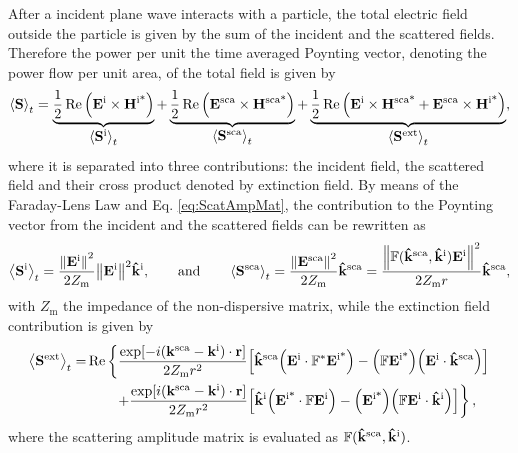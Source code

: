 After a incident plane wave interacts with a particle, the total electric field outside the particle is given by the sum of the incident and the scattered fields. Therefore the power per unit  the time averaged Poynting vector, denoting the power flow per unit area, of the total field is given by 
%
\begin{align}
\ev{\vb{S}}_t 
		= \underbrace{\frac12 \Re \qty(\vb{E}^\text{i}\times\vb{H}^\text{i*})}_{\text{\normalsize $\ev{\vb{S}^\text{i}}_t $}} + 
		\underbrace{\frac12 \Re \qty(\vb{E}^\text{sca}\times\vb{H}^\text{sca*})}_{\text{\normalsize $\ev{\vb{S}^\text{sca}}_t $}}+
		\underbrace{	\frac12 \Re\qty(\vb{E}^\text{i}\times\vb{H}^\text{sca*} + \vb{E}^\text{sca}\times\vb{H}^\text{i*})}_{\text{\normalsize$\ev{\vb{S}^\text{ext}}_t$}},
\label{eq:Stot}
\end{align}
%
where it is separated into three contributions: the incident field, the scattered field and their cross product denoted by extinction field. By means of the Faraday-Lens Law and Eq. \eqref{eq:ScatAmpMat}, the  contribution to the Poynting vector from the incident and the scattered fields can be rewritten as
%
\begin{equation}
\ev{\vb{S}^\text{i}}_t = \frac{\norm{\vb{E}^\text{i}}^2}{2 Z_\text{m}}\norm{\vb{E}^\text{i}}^2\vu{k}^\text{i},
\qquad\text{and}\qquad
\ev{\vb{S}^\text{sca}}_t = \frac{\norm{\vb{E}^\text{sca}}^2}{2 Z_\text{m}}\vu{k}^\text{sca} 
						=  \frac{\norm{\mathbb{F}(\vu{k}^\text{sca},\vu{k}^\text{i})\vb{E}^\text{i}}^2}{2 Z_\text{m}r}\vu{k}^\text{sca},
\end{equation}
%
with $Z_\text{m}$ the impedance of the non-dispersive matrix, while the extinction field contribution is given by
%
\begin{align}
\ev{\vb{S}^\text{ext}}_t = &\Re\left\{
									\frac{\exp[-i(\vb{k}^\text{sca}-\vb{k}^\text{i})\cdot\vb{r}]}{2 Z_\text{m}r^2}
									\qty[\vu{k}^\text{sca}\qty(\vb{E}^\text{i}\cdot \mathbb{F}^*\vb{E}^\text{i*})     
										-\qty(\mathbb{F}\vb{E}^\text{i*})	\qty(\vb{E}^\text{i}\cdot\vu{k}^\text{sca})]
								 \right.\notag	\\
								&\hspace{2em}\left.
								+\frac{\exp[i(\vb{k}^\text{sca}-\vb{k}^\text{i})\cdot\vb{r}]}{2 Z_\text{m}r^2}
									\qty[\vu{k}^\text{i}\qty(\vb{E}^\text{i*}\cdot \mathbb{F}\vb{E}^\text{i})     
										-\qty(\vb{E}^\text{i*})	\qty(\mathbb{F}\vb{E}^\text{i}\cdot\vu{k}^\text{i})]	\right\},					
\end{align}
%
where the scattering amplitude matrix is evaluated as $\mathbb{F}(\vu{k}^\text{sca},\vu{k}^\text{i})$.

